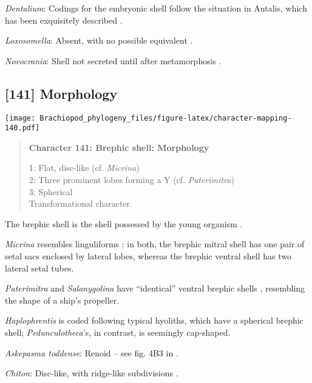 \documentclass[openany]{book}
\theoremstyle{definition}
\theoremstyle{definition}
\theoremstyle{definition}
\theoremstyle{remark}
\begin{document}
\hypertarget{Dentalium-coding-140}{}
\emph{Dentalium}: Codings for the embryonic shell follow the situation
in Antalis, which has been exquisitely described \citep{Wanninger2001}.

\hypertarget{Loxosomella-coding-140}{}
\emph{Loxosomella}: Absent, with no possible equivalent
\citep{Nielsen1966}.

\hypertarget{Novocrania-coding-140}{}
\emph{Novocrania}: Shell not secreted until after metamorphosis
\citep{Popov2010Earliestontogeny}.

\subsection*{{[}141{]} Morphology}\label{morphology}

\texttt{[image: Brachiopod\_phylogeny\_files/figure-latex/character-mapping-140.pdf]}

\begin{quote}
\textbf{Character 141: Brephic shell: Morphology}

1: Flat, disc-like (cf. \emph{Micrina})\\
2: Three prominent lobes forming a Y (cf. \emph{Paterimitra})\\
3: Spherical\\
Transformational character.
\end{quote}

The brephic shell is the shell possessed by the young organism
\citep[see][ and references therein for discussion of
terminology]{Ushatinskaya2016Revisionof}.

\emph{Micrina} resembles linguliforms \citep{Holmer2011Firstrecord}: in
both, the brephic mitral shell has one pair of setal sacs enclosed by
lateral lobes, whereas the brephic ventral shell has two lateral setal
tubes.

\emph{Paterimitra} and \emph{Salanygolina} have ``identical'' ventral
brephic shells \citep{Holmer2011Firstrecord}, resembling the shape of a
ship's propeller.

\emph{Haplophrentis} is coded following typical hyoliths, which have a
spherical brephic shell; \emph{Pedunculotheca}'s, in contrast, is
seemingly cap-shaped.

\hypertarget{Askepasma_toddense-coding-141}{}
\emph{Askepasma toddense}: Renoid -- see fig. 4B3 in
\citet{Topper2013Theoldest}.

\hypertarget{Chiton-coding-141}{}
\emph{Chiton}: Disc-like, with ridge-like subdivisions
\citep{Wanninger2002C}.
\end{document}
